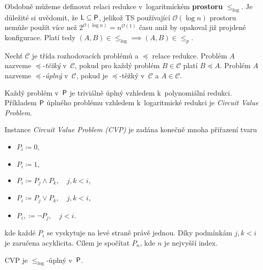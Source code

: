 Obdobně můžeme definovat relaci redukce v~logaritmickém {\bf prostoru}
$\leq_{\log}$. Je důležité si uvědomit, že $\L \subseteq \P$,
jelikož TS používající $\mathcal{O}(\log n)$ prostoru nemůže
použít více než $2^{\mathcal{O}(\log n)} = n^{\mathcal{O}(1)}$ času
aniž by opakoval již projdené konfigurace. Platí tedy
$(A,B) \in {\leq_{\log}} \implies (A,B) \in {\leq_p}$.

\begin{definition}
    Nechť $\mathcal{C}$ je třída rozhodovacích problémů
    a $\preceq$ relace redukce.
    Problém $A$ nazveme $\preceq$-{\em těžký} v~$\mathcal{C}$,
    pokud pro každý problém $B \in \mathcal{C}$
    platí $B \preceq A$.
    Problém $A$ nazveme $\preceq$-{\em úplný} v~$\mathcal{C}$, pokud je
    $\preceq$-těžký v~$\mathcal{C}$ a $A \in \mathcal{C}$.
\end{definition}

Každý problém v~$\P$ je triviálně úplný vzhledem k~polynomiální redukci.
Příkladem $\P$ úplného problému vzhledem k~logaritmické redukci je
{\em Circuit Value Problem}.

\begin{definition}
    Instance {\em Circuit Value Problem (CVP)}
    je zadána konečně mnoha přiřazení tvaru
    \begin{itemize}
        \item $P_i \coloneqq 0$,
        \item $P_i \coloneqq 1,$
        \item $P_i \coloneqq P_j \land P_k, \quad j, k < i$,
        \item $P_i \coloneqq P_j \lor P_k, \quad j, k < i$,
        \item $P_i, \coloneqq \neg P_j, \quad j < i$.
    \end{itemize}
    kde každé $P_i$ se vyskytuje na levé straně právě jednou. Díky
    podmínkám $j,k < i$ je zaručena acyklicita. Cílem je spočítat $P_n$,
    kde $n$ je nejvyšší index.
\end{definition}

\begin{theorem}
    CVP je $\leq_{\log}$-úplný v~$\P$.
\end{theorem}

